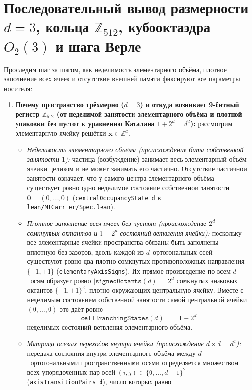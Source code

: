 \section{Последовательный вывод размерности \texorpdfstring{$d=3$}{d=3}, кольца \texorpdfstring{$\mathbb{Z}_{512}$}{Z512}, кубооктаэдра \texorpdfstring{$O_2(3)$}{O2(3)} и шага Верле}

Проследим шаг за шагом, как неделимость элементарного объёма, плотное заполнение всех ячеек и отсутствие внешней памяти фиксируют все параметры носителя:

\begin{enumerate}[label=\textbf{Шаг \arabic*.},leftmargin=*]
\item \textbf{Почему пространство трёхмерно ($d = 3$) и откуда возникает 9-битный регистр $\mathbb{Z}_{512}$ (от неделимой занятости элементарного объёма и плотной упаковки без пустот к уравнению Каталана $1 + 2^d = d^2$):}
  рассмотрим элементарную ячейку решётки $\mathbf{x} \in \mathbb{Z}^d$.
  \begin{itemize}[noitemsep]
  \item \emph{Неделимость элементарного объёма (происхождение бита собственной занятости $1$):} частица (возбуждение) занимает весь элементарный объём ячейки целиком и не может занимать его частично. Отсутствие частичной занятости означает, что у самого центра элементарного объёма существует ровно одно неделимое состояние собственной занятости $\mathbf{0} = (0, \dots, 0)$ (\texttt{centralOccupancyState d} в \texttt{lean/MtCarrier/Spec.lean}).
  \item \emph{Плотное заполнение всех ячеек без пустот (происхождение $2^d$ сомкнутых октантов и $1 + 2^d$ состояний ветвления ячейки):} поскольку все элементарные ячейки пространства обязаны быть заполнены вплотную без зазоров, вдоль каждой из $d$~ортогональных осей существуют ровно два плотно сомкнутых противоположных направления $\{-1, +1\}$ (\texttt{elementaryAxisSigns}). Их прямое произведение по всем $d$~осям образует ровно $|\texttt{signedOctants}(d)| = 2^d$ сомкнутых знаковых октантов $\{-1, +1\}^d$, плотно окружающих центральную ячейку. Вместе с неделимым состоянием собственной занятости самой центральной ячейки $(0, \dots, 0)$ это даёт ровно
  \[
    |\texttt{cellBranchingStates}(d)| \;=\; 1 + 2^d
  \]
  неделимых состояний ветвления элементарного объёма.
  \item \emph{Матрица осевых переходов внутри ячейки (происхождение $d \times d = d^2$):} передача состояния внутри элементарного объёма между $d$~ортогональными пространственными осями определяется множеством всех упорядоченных пар осей $(i, j) \in \{0, \dots, d-1\}^2$ (\texttt{axisTransitionPairs d}), число которых равно

\end{itemize}
\end{enumerate}
